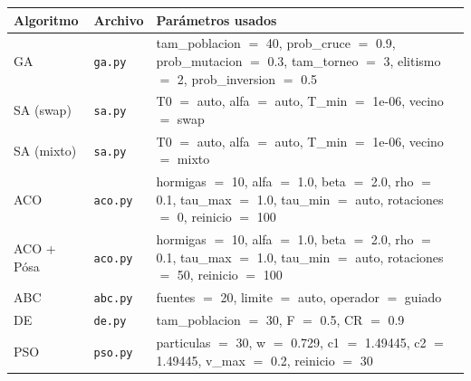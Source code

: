 \begin{tabularx}{\textwidth}{llL}
\toprule
Algoritmo & Archivo & Parámetros usados \\
\midrule
GA & \texttt{ga.py} & tam\_poblacion $=$ 40, prob\_cruce $=$ 0.9, prob\_mutacion $=$ 0.3, tam\_torneo $=$ 3, elitismo $=$ 2, prob\_inversion $=$ 0.5 \\
SA (swap) & \texttt{sa.py} & T0 $=$ auto, alfa $=$ auto, T\_min $=$ 1e-06, vecino $=$ swap \\
SA (mixto) & \texttt{sa.py} & T0 $=$ auto, alfa $=$ auto, T\_min $=$ 1e-06, vecino $=$ mixto \\
ACO & \texttt{aco.py} & hormigas $=$ 10, alfa $=$ 1.0, beta $=$ 2.0, rho $=$ 0.1, tau\_max $=$ 1.0, tau\_min $=$ auto, rotaciones $=$ 0, reinicio $=$ 100 \\
ACO + Pósa & \texttt{aco.py} & hormigas $=$ 10, alfa $=$ 1.0, beta $=$ 2.0, rho $=$ 0.1, tau\_max $=$ 1.0, tau\_min $=$ auto, rotaciones $=$ 50, reinicio $=$ 100 \\
ABC & \texttt{abc.py} & fuentes $=$ 20, limite $=$ auto, operador $=$ guiado \\
DE & \texttt{de.py} & tam\_poblacion $=$ 30, F $=$ 0.5, CR $=$ 0.9 \\
PSO & \texttt{pso.py} & particulas $=$ 30, w $=$ 0.729, c1 $=$ 1.49445, c2 $=$ 1.49445, v\_max $=$ 0.2, reinicio $=$ 30 \\
\bottomrule
\end{tabularx}
